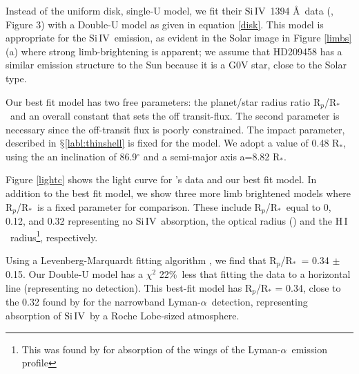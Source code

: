 \documentclass[manuscript]{aastex}
\newcommand{\hi}{\ensuremath{\mathrm{H}\,\scriptstyle \mathrm{I}}}
\newcommand{\siIV}{\ensuremath{\mathrm{Si}\,\scriptstyle \mathrm{IV}}}
\newcommand{\p}{R$_p$/R$_*$}
\newcommand{\lya}{Lyman-$\alpha$}
\begin{document}
Instead of the uniform disk, single-U model, we fit their \siIV\ 1394 \AA\ data (\citet{vidmad}, Figure 3) with a Double-U model as given in equation \ref{disk}. This model is appropriate for the \siIV\ emission, as evident in the Solar image in Figure \ref{limbs} (a) where strong limb-brightening is apparent; we assume that HD209458 has a similar emission structure to the Sun because it is a G0V star, close to the Solar type.

Our best fit model has two free parameters: the planet/star radius ratio \p\ and an overall constant that sets the off transit-flux. The second parameter is necessary since the off-transit flux is poorly constrained. The impact parameter, described in $\mathsection$\ref{labl:thinshell} is fixed for the model. We adopt a value of 0.48 R$_*$, using the an inclination of 86.9$^\circ$ \citep{knutsonprop} and a semi-major axis a=8.82 R$_*$.

Figure \ref{lightc} shows the light curve for \citet{vidmad}'s data and our best fit model. In addition to the best fit model, we show three more limb brightened models where \p\ is a fixed parameter for comparison. These include \p\ equal to 0, 0.12, and 0.32 representing no \siIV\ absorption, the optical radius (\citep{knutsonprop}) and the \hi\ radius\footnote{This was found by \citet{vidmad} for absorption of the wings of the \lya\ emission profile}, respectively.

Using a Levenberg-Marquardt fitting algorithm \citep{mpfit}, we find that \p\ = 0.34 $\pm$ 0.15. 
Our Double-U model has a $\chi^2$  22\%\ less that fitting the data to
a horizontal line (representing no detection). This best-fit model has
R$_p$/R$_*$ = 0.34, close to the 0.32 found by \citet{vidmad} for the narrowband \lya\ detection, representing absorption of \siIV\ by a Roche Lobe-sized atmosphere.

\end{document}
